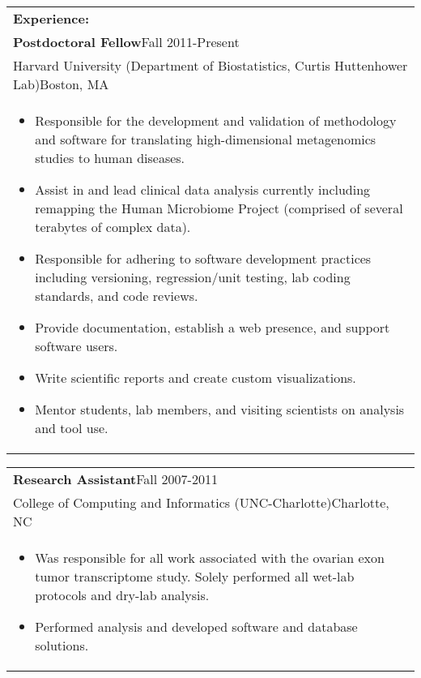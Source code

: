 \documentclass[12pt]{report}
\def\fullLength{6.5in}
\begin{document}
\begin{table}[!ht]
\begin{tabular}{p{\fullLength}}
\textbf{\Large Experience:}\\
\textbf{Postdoctoral Fellow}\hfill Fall 2011-Present\\
Harvard University (Department of Biostatistics, Curtis Huttenhower Lab)\hfill Boston, MA\\
\vspace{-7.0mm}
\begin{itemize}\addtolength{\itemsep}{-0.5\baselineskip}
\item Responsible for the development and validation of methodology and software for translating high-dimensional metagenomics studies to human diseases.
\item Assist in and lead clinical data analysis currently including remapping the Human Microbiome Project (comprised of several terabytes of complex data).
\item Responsible for adhering to software development practices including versioning, regression/unit testing, lab coding standards, and code reviews.
\item Provide documentation, establish a web presence, and support software users.
\item Write scientific reports and create custom visualizations.
\item Mentor students, lab members, and visiting scientists on analysis and tool use.
\end{itemize}
\end{tabular}
\end{table}

\vspace{-12.0mm}

\begin{table}[!ht]
\begin{tabular}{p{\fullLength}}
\textbf{Research Assistant}\hfill Fall 2007-2011\\
College of Computing and Informatics (UNC-Charlotte)\hfill Charlotte, NC\\
\vspace{-7.0mm}
\begin{itemize}\addtolength{\itemsep}{-0.5\baselineskip}
\item Was responsible for all work associated with the ovarian exon tumor transcriptome study. Solely performed all wet-lab protocols and dry-lab analysis.
\item Performed analysis and developed software and database solutions.
\end{itemize}
\end{tabular}
\end{table}
\end{document}
